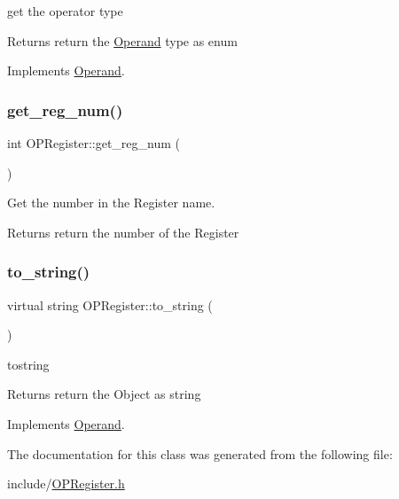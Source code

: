 get the operator type 

\begin{DoxyReturn}{Returns}
return the \mbox{\hyperlink{class_operand}{Operand}} type as enum 
\end{DoxyReturn}


Implements \mbox{\hyperlink{class_operand_afd469e305a467e2574f34ac9bd6c62b0}{Operand}}.

\mbox{\label{class_o_p_register_acd1c47e67de36adf6b1b88c0a4760b7e}} 
\subsubsection{\texorpdfstring{get\+\_\+reg\+\_\+num()}{get\_reg\_num()}}
{\footnotesize\ttfamily int O\+P\+Register\+::get\+\_\+reg\+\_\+num (\begin{DoxyParamCaption}{ }\end{DoxyParamCaption})}



Get the number in the Register name. 

\begin{DoxyReturn}{Returns}
return the number of the Register 
\end{DoxyReturn}
\mbox{\label{class_o_p_register_a9f55bdff75224fb18973a9e913a4022f}} 
\subsubsection{\texorpdfstring{to\+\_\+string()}{to\_string()}}
{\footnotesize\ttfamily virtual string O\+P\+Register\+::to\+\_\+string (\begin{DoxyParamCaption}{ }\end{DoxyParamCaption})\hspace{0.3cm}{\ttfamily [virtual]}}



tostring 

\begin{DoxyReturn}{Returns}
return the Object as string 
\end{DoxyReturn}


Implements \mbox{\hyperlink{class_operand_a28aed96d5fafee66be81c30c1435ad00}{Operand}}.



The documentation for this class was generated from the following file\+:\begin{DoxyCompactItemize}
\item 
include/\mbox{\hyperlink{_o_p_register_8h}{O\+P\+Register.\+h}}\end{DoxyCompactItemize}
